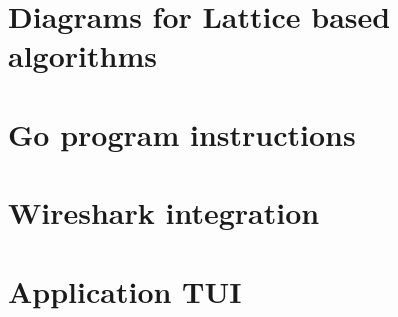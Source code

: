 \chapter{Diagrams for Lattice based algorithms}
\label{ch:block_diagrams}


\chapter{Go program instructions}
\label{ch:go_instructions}


\chapter{Wireshark integration}
\label{ch:wireshark}


\chapter{Application TUI}
\label{ch:TUI_example}

